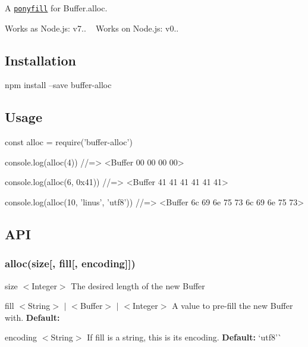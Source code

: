 A \href{https://ponyfill.com}{\tt ponyfill} for {\ttfamily Buffer.\+alloc}.

Works as Node.\+js\+: {\ttfamily v7..} ~\newline
 Works on Node.\+js\+: {\ttfamily v0..}

\subsection*{Installation}


\begin{DoxyCode}
npm install --save buffer-alloc
\end{DoxyCode}


\subsection*{Usage}


\begin{DoxyCode}
const alloc = require('buffer-alloc')

console.log(alloc(4))
//=> <Buffer 00 00 00 00>

console.log(alloc(6, 0x41))
//=> <Buffer 41 41 41 41 41 41>

console.log(alloc(10, 'linus', 'utf8'))
//=> <Buffer 6c 69 6e 75 73 6c 69 6e 75 73>
\end{DoxyCode}


\subsection*{A\+PI}

\subsubsection*{alloc(size\mbox{[}, fill\mbox{[}, encoding\mbox{]}\mbox{]})}


\begin{DoxyItemize}
\item {\ttfamily size} $<$Integer$>$ The desired length of the new {\ttfamily Buffer}
\item {\ttfamily fill} $<$String$>$ $\vert$ $<$Buffer$>$ $\vert$ $<$Integer$>$ A value to pre-\/fill the new {\ttfamily Buffer} with. {\bfseries Default\+:} {}
\item {\ttfamily encoding} $<$String$>$ If {\ttfamily fill} is a string, this is its encoding. {\bfseries Default\+:} `\textquotesingle{}utf8'\`{}
\end{DoxyItemize}

